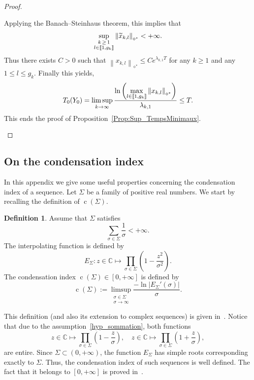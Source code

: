 \documentclass[10pt]{amsart}
\theoremstyle{definition}\newtheorem{defi}[theo]{Definition}\newtheorem{rema}[theo]{Remark}\newtheorem{exam}[theo]{Example}\newtheorem{exem}[theo]{Example}\newtheorem{nota}[theo]{Notation}
\newcommand{\llbracket}{\mathopen{[\mkern -2.7mu[}}
\newcommand{\rrbracket}{\mathclose{]\mkern -2.7mu]}}
\newcommand{\inter}[2]{\llbracket #1,#2 \rrbracket}
\newcommand{\Fzp}{Y_0}
\newcommand{\normeXalphas}[1]{\left\| #1 \right\|_{\diamond^*}}
\newcommand{\n}{g}
\newcommand{\C}{\mathbb{C}}
\DeclareMathOperator{\cond}{c}
\let\oldtilde\tilde
\renewcommand*{\tilde}[1]{\mathchoice{\widetilde{#1}}{\widetilde{#1}}{\oldtilde{#1}}{\oldtilde{#1}}}\let\oldexists\exists
\renewcommand*{\exists}{\mathrel{\oldexists}}
\begin{document}
\begin{proof}
\begin{itemize}
Applying the Banach--Steinhaus theorem, this implies that
\[
\sup_{\substack{k\,\geq\,1 \\ l\in \inter{1}{\n_k}}} \normeXalphas{ \tilde{x}_{k,l} } < + \infty.
\]
Thus there exists $C>0$ such that $\normeXalphas{x_{k,l}} \leq C e^{\lambda_{k,1} T}$ for any $k \geq 1$ and any $1\leq l\leq \n_k$. Finally this yields,
\[
T_{0}(\Fzp) = \limsup_{k \to \infty} \frac{\ln \left(\max\limits_{l\in \inter{1}{\n_k}} \normeXalphas{ x_{k,l} } \right)}{\lambda_{k,1}} \leq T.
\]
This ends the proof of Proposition~\ref{Prop:Sup_TempsMinimaux}.
\end{itemize}
\end{proof}



\subsection{On the condensation index} \label{AnnexeCondensation}


In this appendix we give some useful properties concerning the condensation index of a sequence. Let $\Sigma$ be a family of positive real numbers. We start by recalling the definition of $\cond(\Sigma)$.
\begin{defi} \label{Def:Condensation_Shackell}
Assume that $\Sigma$ satisfies
\begin{equation}\label{hyp_sommation}
\sum\limits_{\sigma\in \Sigma} \frac{1}{\sigma} <+\infty.
\end{equation}
The interpolating function is defined by
\begin{equation}\label{DefE}
E_\Sigma : z \in \C \mapsto \prod_{\sigma\in \Sigma}\left(1 - \frac{z^2}{\sigma^2} \right).
\end{equation}
The condensation index $\cond(\Sigma)\in [0,+\infty]$ is defined by
\[
\cond(\Sigma) := \limsup_{\substack{\sigma\in\Sigma\\ \sigma \to \infty}} \frac{- \ln |E_\Sigma'(\sigma)|}{\sigma}.
\]
\end{defi}
This definition (and also its extension to complex sequences) is given in~\cite{Shackell69}. Notice that due to the assumption~\eqref{hyp_sommation}, both functions
\[
z \in \C \mapsto \prod_{\sigma\in \Sigma}\left(1 - \frac{z}{\sigma} \right),
\quad z \in \C \mapsto \prod_{\sigma\in \Sigma}\left(1 + \frac{z}{\sigma} \right),
\]
are entire. Since $\Sigma \subset (0, +\infty)$, the function $E_\Sigma$ has simple roots corresponding exactly to $\Sigma$. Thus, the condensation index of such sequences is well defined. The fact that it belongs to $[0,+\infty]$ is proved in~\cite{AmmarKhodjaBenabdallahGonzalez-BurgosdeTeresa:2014}.
\end{document}
